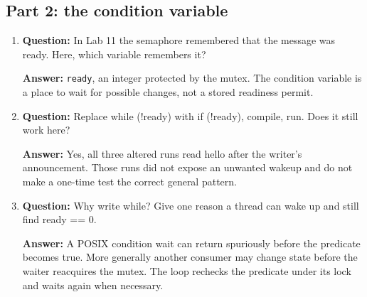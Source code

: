 \documentclass[12pt]{article}
\begin{document}
\subsection{Part 2: the condition variable}
\begin{enumerate}
\item \textbf{Question:} In Lab 11 the semaphore remembered that the message was ready. Here, which variable remembers it?
\par\textbf{Answer:} \texttt{ready}, an integer protected by the mutex.
The condition variable is a place to wait for possible changes, not a
stored readiness permit.

\item \textbf{Question:} Replace while (!ready) with if (!ready), compile, run. Does it still work here?
\par\textbf{Answer:} Yes, all three altered runs read hello after the
writer's announcement. Those runs did not expose an unwanted wakeup and
do not make a one-time test the correct general pattern.

\item \textbf{Question:} Why write while? Give one reason a thread can wake up and still find ready == 0.
\par\textbf{Answer:} A POSIX condition wait can return spuriously before
the predicate becomes true. More generally another consumer may change
state before the waiter reacquires the mutex. The loop rechecks the
predicate under its lock and waits again when necessary.
\end{enumerate}

\end{document}
